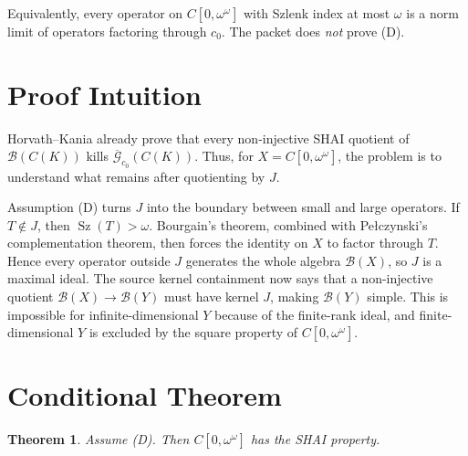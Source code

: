\documentclass[11pt]{article}
\newtheorem{theorem}{Theorem}
\newcommand{\B}{\mathscr{B}}
\newcommand{\G}{\mathscr{G}}
\newcommand{\Sz}{\operatorname{Sz}}
\begin{document}
Equivalently, every operator on \(C[0,\omega^\omega]\) with Szlenk index at
most \(\omega\) is a norm limit of operators factoring through \(c_0\).
The packet does \emph{not} prove (D).

\section*{Proof Intuition}

Horvath--Kania already prove that every non-injective SHAI quotient of
\(\B(C(K))\) kills \(\overline{\G}_{c_0}(C(K))\).  Thus, for
\(X=C[0,\omega^\omega]\), the problem is to understand what remains after
quotienting by \(J\).

Assumption (D) turns \(J\) into the boundary between small and large
operators.  If \(T\notin J\), then \(\Sz(T)>\omega\).  Bourgain's theorem,
combined with Pe\l{}czynski's complementation theorem, then forces the
identity on \(X\) to factor through \(T\).  Hence every operator outside
\(J\) generates the whole algebra \(\B(X)\), so \(J\) is a maximal ideal.
The source kernel containment now says that a non-injective quotient
\(\B(X)\to\B(Y)\) must have kernel \(J\), making \(\B(Y)\) simple.  This is
impossible for infinite-dimensional \(Y\) because of the finite-rank ideal,
and finite-dimensional \(Y\) is excluded by the square property of
\(C[0,\omega^\omega]\).

\section*{Conditional Theorem}

\begin{theorem}
Assume (D).  Then \(C[0,\omega^\omega]\) has the SHAI property.
\end{theorem}
\end{document}
